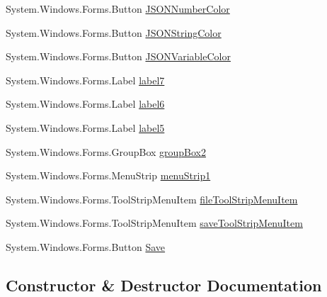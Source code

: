\begin{DoxyCompactItemize}
\item 
System.\+Windows.\+Forms.\+Button \mbox{\hyperlink{class_cert_complete_1_1_preferences_a1e5ab0a4d6d03d7a72575565b0f1afa7}{J\+S\+O\+N\+Number\+Color}}
\item 
System.\+Windows.\+Forms.\+Button \mbox{\hyperlink{class_cert_complete_1_1_preferences_a7b8a168de2b803e8fc6ef44a33a6dbe7}{J\+S\+O\+N\+String\+Color}}
\item 
System.\+Windows.\+Forms.\+Button \mbox{\hyperlink{class_cert_complete_1_1_preferences_ad90deddcf8c00c327d2cdb3a2ec9ae08}{J\+S\+O\+N\+Variable\+Color}}
\item 
System.\+Windows.\+Forms.\+Label \mbox{\hyperlink{class_cert_complete_1_1_preferences_a8377ca10192c18073d3ca11e6101b45c}{label7}}
\item 
System.\+Windows.\+Forms.\+Label \mbox{\hyperlink{class_cert_complete_1_1_preferences_ae76ba95477b89c7cf8bdcdeef89074c9}{label6}}
\item 
System.\+Windows.\+Forms.\+Label \mbox{\hyperlink{class_cert_complete_1_1_preferences_adcc6592cc33b1464e4217901d416ea49}{label5}}
\item 
System.\+Windows.\+Forms.\+Group\+Box \mbox{\hyperlink{class_cert_complete_1_1_preferences_a67db2d00b7a9d7cd1d6b2d53b180da12}{group\+Box2}}
\item 
System.\+Windows.\+Forms.\+Menu\+Strip \mbox{\hyperlink{class_cert_complete_1_1_preferences_a220a4223a705544297f65161da8f02a9}{menu\+Strip1}}
\item 
System.\+Windows.\+Forms.\+Tool\+Strip\+Menu\+Item \mbox{\hyperlink{class_cert_complete_1_1_preferences_a6fc9d2b1ef371b71da692702ffde6890}{file\+Tool\+Strip\+Menu\+Item}}
\item 
System.\+Windows.\+Forms.\+Tool\+Strip\+Menu\+Item \mbox{\hyperlink{class_cert_complete_1_1_preferences_ae4371c8326695d8b15fd9ea7da0d7dad}{save\+Tool\+Strip\+Menu\+Item}}
\item 
System.\+Windows.\+Forms.\+Button \mbox{\hyperlink{class_cert_complete_1_1_preferences_a25c8e141f13048880b08b642b3afbf9b}{Save}}
\end{DoxyCompactItemize}


\subsection{Constructor \& Destructor Documentation}
\mbox{\label{class_cert_complete_1_1_preferences_a5a7e543437dd3ef1fcde6476be53edaa}} 
